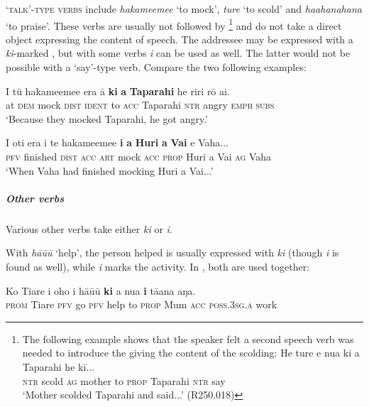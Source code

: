 \textsc{‘}\textsc{talk’-type verbs} include \textit{hakame{\ꞌ}eme{\ꞌ}e} ‘to mock’, \textit{ture} ‘to scold’ and \textit{ha{\ꞌ}a\-hana\-hana} ‘to praise’. These verbs are usually not followed by \footnote{\label{fn:437}The following example shows that the speaker felt a second speech verb was needed to introduce the  giving the content of the scolding:
\ea
\gll 
He ture e nua ki a Taparahi he kī...\\
  \textsc{ntr} scold \textsc{ag} mother to \textsc{prop} Taparahi \textsc{ntr} say \\
  \glt  
  ‘Mother scolded Taparahi and said...’ (R250.018)
  \z } and do not take a direct object expressing the content of speech. The addressee may be expressed with a \textit{ki}{}-marked , but with some verbs \textit{i} can be used as well. The latter would not be possible with a ‘say’-type verb. Compare the two following examples:

\ea\label{ex:8.123}
\gll {\ꞌ}I tū hakame{\ꞌ}eme{\ꞌ}e era {\ꞌ}ā \textbf{ki} \textbf{a} \textbf{Taparahi} he riri rō {\ꞌ}ai. \\
at \textsc{dem} mock \textsc{dist} \textsc{ident} to \textsc{acc} Taparahi \textsc{ntr} angry \textsc{emph} \textsc{subs} \\

\glt 
‘Because they mocked Taparahi, he got angry.’ \textstyleExampleref{[R250.012]} 
\z

\ea\label{ex:8.124}
\gll I oti era i te hakame{\ꞌ}eme{\ꞌ}e \textbf{i} \textbf{a} \textbf{Huri} \textbf{{\ꞌ}a} \textbf{Vai} e Vaha... \\
\textsc{pfv} finished \textsc{dist} \textsc{acc} \textsc{art} mock \textsc{acc} \textsc{prop} Huri a Vai \textsc{ag} Vaha \\

\glt 
‘When Vaha had finished mocking Huri a Vai...’ \textstyleExampleref{[R304.094]} 
\z

\subparagraph{Other verbs} Various other verbs take either \textit{ki} or \textit{i}. 

With \textit{hā{\ꞌ}ū{\ꞌ}ū} ‘help’, the person helped is usually expressed with \textit{ki} (though \textit{i} is found as well), while \textit{i} marks the activity. In , both are used together:

\ea\label{ex:8.125}
\gll Ko Tiare i oho i hā{\ꞌ}ū{\ꞌ}ū \textbf{ki} a nua \textbf{i} tā{\ꞌ}ana aŋa. \\
\textsc{prom} Tiare \textsc{pfv} go \textsc{pfv} help to \textsc{prop} Mum \textsc{acc} \textsc{poss.3sg.a} work \\

